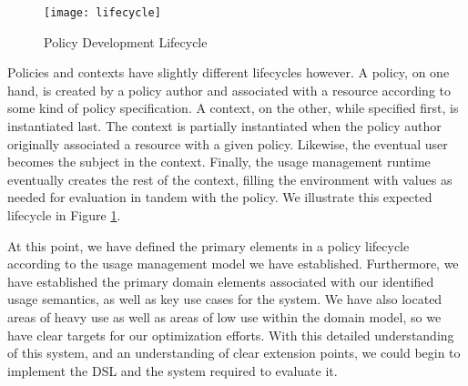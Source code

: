 \begin{figure}[!t]
\centering
\texttt{[image: lifecycle]}
\caption{Policy Development Lifecycle}
\label{fig:model:lifecycle}
\end{figure}

Policies and contexts have slightly different lifecycles however.  A policy, on one hand, is created by a policy author and associated with a resource according to some kind of policy specification.  A context, on the other, while specified first, is instantiated last.  The context is partially instantiated when the policy author originally associated a resource with a given policy.  Likewise, the eventual user becomes the subject in the context.  Finally, the usage management runtime eventually creates the rest of the context, filling the environment with values as needed for evaluation in tandem with the policy.  We illustrate this expected lifecycle in Figure \ref{fig:model:lifecycle}.

At this point, we have defined the primary elements in a policy lifecycle according to the usage management model we have established.  Furthermore, we have established the primary domain elements associated with our identified usage semantics, as well as key use cases for the system.  We have also located areas of heavy use as well as areas of low use within the domain model, so we have clear targets for our optimization efforts.  With this detailed understanding of this system, and an understanding of clear extension points, we could begin to implement the DSL and the system required to evaluate it.